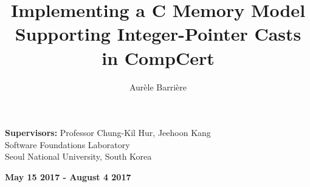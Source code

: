 \documentclass{llncs2e/llncs}
\begin{document}
%
\pagestyle{headings}  %
%
\title{Implementing a C Memory Model Supporting Integer-Pointer Casts in CompCert}
%
\author{Aur\`ele Barri\`ere}
%
%

\maketitle              %

\hrulefill

\begin{center}
  \textbf{Supervisors: } Professor Chung-Kil Hur, Jeehoon Kang\\
  Software Foundations Laboratory\\
  Seoul National University, South Korea
\end{center}

\hrulefill

\begin{center}
  \textbf{May 15 2017 - August 4 2017}
\end{center}
\end{document}
